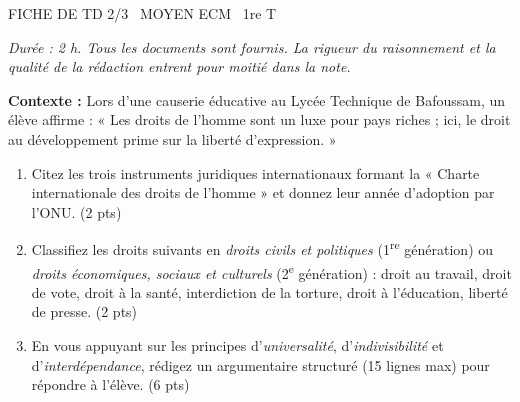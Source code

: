 \documentclass[11pt]{article}
\begin{document}
\begin{tcolorbox}[enhanced,colback=popink,colframe=popink,arc=10pt,boxrule=0pt,left=12pt,right=12pt,top=9pt,bottom=9pt]
{\color{white}\popxbold\small FICHE DE TD 2/3 \textbullet\ MOYEN \hfill ECM \textbullet\ 1re T\par}
\end{tcolorbox}
\vspace{4pt}
\emph{Durée : 2 h. Tous les documents sont fournis. La rigueur du raisonnement et la qualité de la rédaction entrent pour moitié dans la note.}

\begin{exercice}
\label{exo:cadre}
\textbf{Contexte :} Lors d'une causerie éducative au Lycée Technique de Bafoussam, un élève affirme : « Les droits de l'homme sont un luxe pour pays riches ; ici, le droit au développement prime sur la liberté d'expression. »
\begin{enumerate}
    \item Citez les trois instruments juridiques internationaux formant la « Charte internationale des droits de l'homme » et donnez leur année d'adoption par l'ONU. \hfill (2 pts)
    \item Classifiez les droits suivants en \emph{droits civils et politiques} (1\textsuperscript{re} génération) ou \emph{droits économiques, sociaux et culturels} (2\textsuperscript{e} génération) : droit au travail, droit de vote, droit à la santé, interdiction de la torture, droit à l'éducation, liberté de presse. \hfill (2 pts)
    \item En vous appuyant sur les principes d'\emph{universalité}, d'\emph{indivisibilité} et d'\emph{interdépendance}, rédigez un argumentaire structuré (15 lignes max) pour répondre à l'élève. \hfill (6 pts)
\end{enumerate}
\end{exercice}
\end{document}

